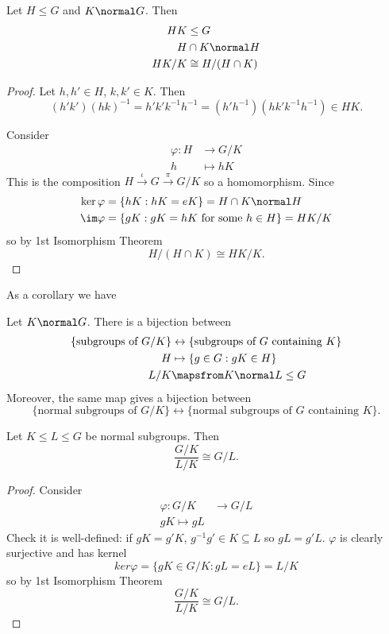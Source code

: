 \documentclass[a4paper]{article}
\begin{document}
\begin{theorem}
  Let \(H \leq G\) and \(K \normal G\). Then
  \begin{align*}
    HK &\leq G \\
    H &\cap K \normal H \\
    HK/K &\cong H/(H \cap K)
  \end{align*}
\end{theorem}

\begin{proof}
  Let \(h, h' \in H\), \(k, k' \in K\). Then
  \[
    (h'k')(hk)^{-1} = h'k'k^{-1}h^{-1} = (h'h^{-1})(hk'k^{-1}h^{-1}) \in HK.
  \]

  Consider
  \begin{align*}
    \varphi: H &\to G/K \\
    h &\mapsto hK
  \end{align*}
  This is the composition \(H \stackrel{\iota}{\to} G \stackrel{\pi}{\to} G/K\) so a homomorphism. Since
  \begin{align*}
    \ker \varphi &= \{hK: hK = eK\} = H \cap K \normal H \\
    \im \varphi &= \{gK: gK = hK \text{ for some } h \in H\} = HK/K
  \end{align*}
  so by 1st Isomorphism Theorem
  \[
    H/(H \cap K) \cong HK/K.
  \]
\end{proof}

As a corollary we have

\begin{theorem}
  Let \(K \normal G\). There is a bijection between
  \begin{align*}
    \{\text{subgroups of } G/K\} &\leftrightarrow \{\text{subgroups of \(G\) containing \(K\)}\} \\
    H &\mapsto \{g \in G: gK \in H\} \\
    L/K &\mapsfrom K \normal L \leq G
  \end{align*}
  Moreover, the same map gives a bijection between
  \[
    \{\text{normal subgroups of } G/K\} \leftrightarrow \{\text{normal subgroups of \(G\) containing \(K\)}\}.
  \]
\end{theorem}

\begin{theorem}
  Let \(K \leq L \leq G\) be normal subgroups. Then
  \[
    \frac{G/K}{L/K} \cong G/L.
  \]
\end{theorem}

\begin{proof}
  Consider
  \begin{align*}
    \varphi: G/K &\to G/L \\
    gK \mapsto gL
  \end{align*}
  Check it is well-defined: if \(gK = g'K\), \(g^{-1}g' \in K \subseteq L\) so \(gL = g'L\). \(\varphi\) is clearly surjective and has kernel
  \[
    ker \varphi = \{gK \in G/K: gL = eL\} = L/K
  \]
  so by 1st Isomorphism Theorem
  \[
    \frac{G/K}{L/K} \cong G/L.
  \]
\end{proof}
\end{document}
